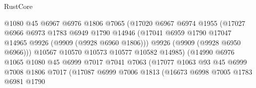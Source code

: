 \begin{lexlean}{RustCore}
\begin{coremodule}
                                  @1080
                                  @45
                                  @6967
                                  @6976
                                  @1806
                                  @7065
                                  (@17020
                                    @6967
                                    @6974
                                    @1955
                                    (@17027
                                      @6966
                                      @6973
                                      @1783
                                      @6949
                                      @1790
                                      @14946
                                      (@17041
                                        @6959
                                        @1790
                                        @17047
                                        @14965
                                        @9926
                                        (@9909 (@9928 @6960 @1806)))
                                      @9926
                                      (@9909 (@9928 @6950 @6966)))
                                    @10567
                                    @10570
                                    @10573
                                    @10577
                                    @10582
                                    @14985)
                                  (@14990
                                    @6976
                                    @1065
                                    @1080
                                    @45
                                    @6999
                                    @7017
                                    @7041
                                    @7063
                                    (@17077
                                      @1063
                                      @93
                                      @45
                                      @6999
                                      @7008
                                      @1806
                                      @7017
                                      (@17087
                                        @6999
                                        @7006
                                        @1813
                                        (@16673
                                          @6998
                                          @7005
                                          @1783
                                          @6981
                                          @1790

\end{coremodule}
\end{lexlean}
